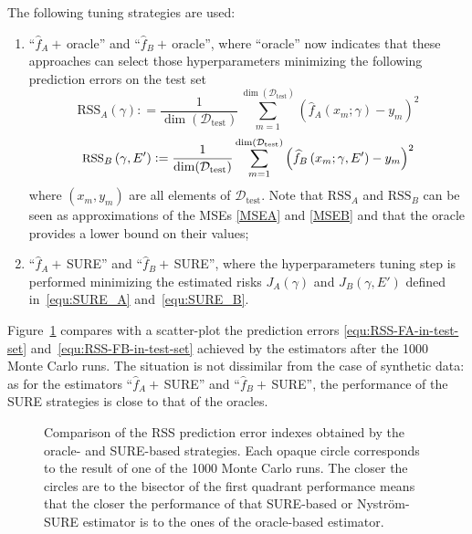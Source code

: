 \documentclass[10pt,twocolumn,twoside]{IEEEtran}					%
\theoremstyle	{plain}
\newcommand{\DefinedAs}			[0]	{\mathrel{\mathop:}=}
\newcommand	{\Figure}				[0]	{Figure}
\begin{document}
The following tuning strategies are used:
\begin{enumerate}
	\item ``$\widehat{f}_{A}+\,$oracle'' and ``$\widehat{f}_{B}+\,$oracle'', where ``oracle'' now indicates that these approaches can select those hyperparameters minimizing the following prediction errors on the test set
	\begin{equation}
		\textrm{RSS}_{A} \left( \gamma \right)
		\DefinedAs
		\frac{1}{\dim(\mathcal{D}_{\textrm{test}})}
		\sum_{m = 1}^{\dim(\mathcal{D}_{\textrm{test}})} \left( \widehat{f}_{A} \left( x_{m} ; \gamma \right) - y_{m} \right)^{2}
		\label{equ:RSS-FA-in-test-set}
	\end{equation}
	\begin{equation}
		\small
		\textrm{RSS}_{B} \left( \gamma, E' \right)
		\DefinedAs
		\frac{1}{\dim(\mathcal{D}_{\textrm{test}})}
		\sum_{m = 1}^{\dim(\mathcal{D}_{\textrm{test}})} \left( \widehat{f}_{B} \left( x_{m} ; \gamma, E' \right) - y_{m} \right)^{2}
		\label{equ:RSS-FB-in-test-set}
	\end{equation}
	where $\left( x_{m}, y_{m} \right)$ are all elements of $\mathcal{D}_{\textrm{test}}$. 
	Note that $\textrm{RSS}_{A}$ and $\textrm{RSS}_{B}$ can be seen as approximations of the \acp{MSE} \eqref{MSEA} and \eqref{MSEB} and that the oracle provides a lower bound on their values;
	\item ``$\widehat{f}_{A}+\,$SURE'' and ``$\widehat{f}_{B}+\,$SURE'', where the hyperparameters tuning step is performed minimizing the estimated risks $J_{A} \left( \gamma \right)$ and $J_{B} \left( \gamma, E' \right)$ defined in~\eqref{equ:SURE_A} and~\eqref{equ:SURE_B}.
\end{enumerate}

\Figure~\ref{fig:distributed_SURE_vs_oracle_Colorado_rain} compares with a scatter-plot the prediction errors \eqref{equ:RSS-FA-in-test-set} and~\eqref{equ:RSS-FB-in-test-set} achieved by the estimators after the 1000 Monte Carlo runs. The situation is not dissimilar from the case of synthetic data: as for the estimators ``$\widehat{f}_{A}+\,$SURE'' and ``$\widehat{f}_{B}+\,$SURE'', the performance of the \ac{SURE} strategies is close to that of the oracles.

\begin{figure}[!htbp]
	\centering
	
	\caption{Comparison of the \ac{RSS} prediction error indexes obtained by the oracle- and \ac{SURE}-based strategies. Each opaque circle corresponds to the result of one of the 1000 Monte Carlo runs. The closer the circles are to the bisector of the first quadrant performance means that the closer the performance of that \ac{SURE}-based or Nystr{\"o}m-\ac{SURE} estimator is to the ones of the oracle-based estimator.}
	\label{fig:distributed_SURE_vs_oracle_Colorado_rain}
\end{figure}
\end{document}
